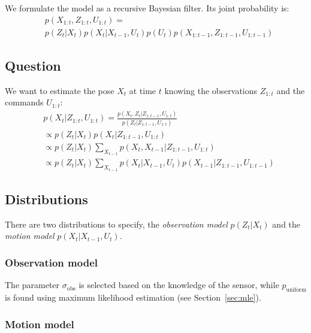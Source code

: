 \documentclass[letterpaper, 10pt, conference]{ieeeconf}
\newcommand{\sect}[1]{Section~\ref{sec:#1}}
\begin{document}
We formulate the model as a recursive Bayesian filter.
Its joint probability is:
\begin{equation}
\begin{split}
& p(X_{1:t}, Z_{1:t}, U_{1:t}) = \\
& p(Z_t|X_t) p(X_t|X_{t-1}, U_{t}) p(U_t) p(X_{1:t-1}, Z_{1:t-1}, U_{1:t-1})
\end{split}
\end{equation}

\subsection{Question}

We want to estimate the pose $X_t$ at time $t$ knowing the observations $Z_{1:t}$ and the commands $U_{1:t}$:
\begin{equation}
\begin{split}
& p(X_t|Z_{1:t},U_{1:t}) = \frac{p(X_t,Z_t | Z_{1:t-1}, U_{1:t})}{p(Z_t|Z_{1:t-1}, U_{1:t})} \\
 &\propto p(Z_t | X_t) p(X_t | Z_{1:t-1}, U_{1:t}) \\
 &\propto p(Z_t | X_t) \sum_{X_{t-1}} p(X_t, X_{t-1} | Z_{1:t-1}, U_{1:t} ) \\
 &\propto p(Z_t | X_t) \sum_{X_{t-1}} p(X_t|X_{t-1}, U_t) p(X_{t-1} | Z_{1:t-1}, U_{1:t-1})
\end{split}
\end{equation}

\subsection{Distributions}

There are two distributions to specify, the \emph{observation model} $p(Z_t | X_t)$ and the \emph{motion model} $p(X_t|X_{t-1}, U_t)$.

\subsubsection{Observation model}


The parameter $\sigma_\mathrm{obs}$ is selected based on the knowledge of the sensor, while $p_\mathrm{uniform}$ is found using maximum likelihood estimation (see \sect{mle}).

\subsubsection{Motion model}
\end{document}
